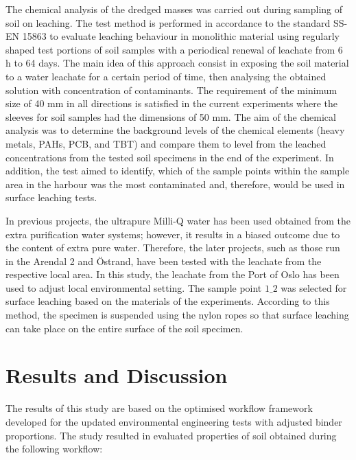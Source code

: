 \documentclass[algorithms,article,accept,pdftex,moreauthors]{Definitions/mdpi}
\begin{document}
The chemical analysis of the dredged masses was carried out during sampling of soil on leaching. {The test method is performed in accordance to the standard SS-EN 15863 to evaluate leaching behaviour in monolithic material using regularly shaped test portions of soil samples with a periodical renewal of leachate from 6 h to 64 days. The main idea of this approach consist in exposing the soil material to a water leachate for a certain period of time, then analysing the obtained solution with concentration of contaminants. The requirement of the minimum size of 40 mm in all directions is satisfied in the current experiments where the sleeves for soil samples had the dimensions of 50 mm. }The aim of the chemical analysis was to determine the background levels of the chemical elements (heavy metals, PAHs, PCB, and TBT) and compare them to level from {the }leached {concentrations} from the tested soil {specimens in the end of the experiment. }In addition, the test aimed to identify, which of the sample points within the sample area in the harbour was the most contaminated and, therefore, would be used in surface leaching tests. 

In previous projects, {the ultrapure }Milli-Q water has been used {obtained from the extra purification water systems; }however, it results in {a} biased {outcome} due to the content of extra pure water. Therefore, the later projects, such as {those run in the }Arendal 2 and Östrand, have been tested with the leachate from the respective local area. In this study, the leachate from the Port of Oslo has been used {to adjust local environmental setting. The} sample point $1\_2$ was selected for surface leaching {based} on the materials of the experiments. {According to} this method, the specimen is suspended {using the} nylon ropes so that surface leaching can take place on the entire surface of the soil specimen. 

\section{Results and Discussion}

{The results of this study are based on the} optimised {workflow }framework developed for {the updated }environmental engineering tests {with adjusted binder proportions. The study resulted in } evaluated {properties} of soil {obtained during} the following workflow{:} 
\end{document}
